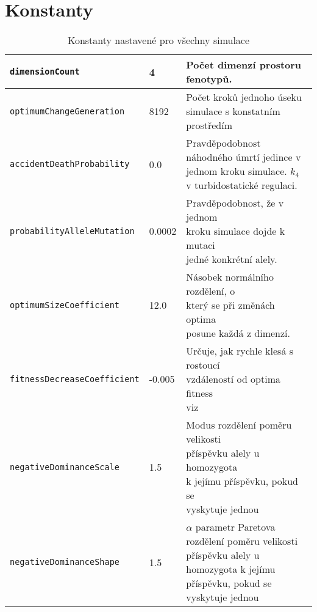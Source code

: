 \section{Konstanty}
\label{sec:constants}



\begin{table}[h]
\caption{Konstanty nastavené pro všechny simulace}

\centering
\label{constants}
\begin{tabularx}{\textwidth}{| l | l | l|}
\hline
\texttt{dimensionCount}             & 4      & Počet dimenzí prostoru fenotypů. \\
\hline
\texttt{optimumChangeGeneration}    & 8192   & \makecell[l]{Počet kroků jednoho úseku\\simulace s konstatním prostředím}\\
\hline
\texttt{accidentDeathProbability}   & 0.0    & \makecell[l]{Pravděpodobnost náhodného úmrtí\\jedince v jednom kroku simulace.\\$k_4$ v turbidostatické regulaci.} \\
\hline
\texttt{probabilityAlleleMutation}  & 0.0002 & \makecell[l]{Pravděpodobnost, že v jednom\\kroku simulace dojde k mutaci\\jedné konkrétní alely.}\\
\hline
\texttt{optimumSizeCoefficient}     & 12.0   & \makecell[l]{Násobek normálního rozdělení, o\\který se při změnách optima\\posune každá z dimenzí.}  \\
\hline
\texttt{fitnessDecreaseCoefficient} & -0.005 & \makecell[l]{Určuje, jak rychle klesá s rostoucí\\vzdáleností od optima fitness\\viz \citet{tenaillon2014utility}}\\
\hline
\texttt{negativeDominanceScale}     & 1.5    & \makecell[l]{Modus rozdělení poměru velikosti\\příspěvku alely u homozygota\\k jejímu příspěvku, pokud se\\vyskytuje jednou} \\
\hline
\texttt{negativeDominanceShape}     & 1.5    & \makecell[l]{$\alpha$ parametr Paretova rozdělení\\ poměru velikosti příspěvku alely\\ u homozygota k jejímu příspěvku,\\ pokud se vyskytuje jednou }\\
\hline
\end{tabularx}
\end{table}
